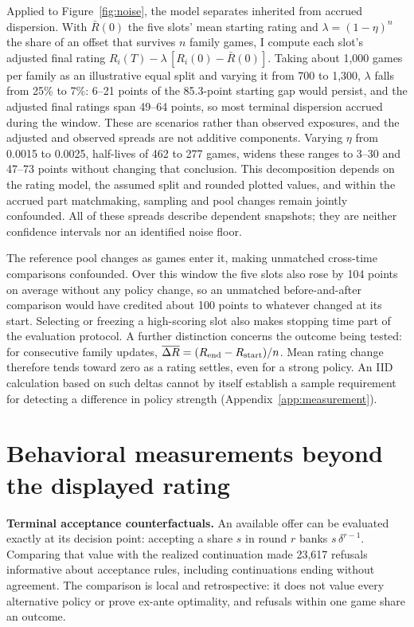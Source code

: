 \documentclass{article}
\begin{document}
Applied to Figure~\ref{fig:noise}, the model separates inherited from accrued
dispersion. With $\bar R(0)$ the five slots' mean starting rating and
$\lambda=(1-\eta)^n$ the share of an offset that survives $n$ family games, I
compute each slot's adjusted final rating $R_i(T)-\lambda\,[R_i(0)-\bar R(0)]$.
Taking about 1,000 games per family as an illustrative equal split and varying it
from 700 to 1,300, $\lambda$ falls from 25\% to 7\%: 6--21 points of the
85.3-point starting gap would persist, and the adjusted final ratings span
49--64 points, so most terminal dispersion accrued during the window. These are
scenarios rather than observed exposures, and the adjusted and observed spreads
are not additive components.
Varying $\eta$ from 0.0015 to 0.0025, half-lives of 462 to 277 games, widens
these ranges to 3--30 and 47--73 points without changing that conclusion. This
decomposition depends on the rating model, the assumed split and rounded
plotted values, and within the accrued part matchmaking, sampling and pool
changes remain jointly confounded. All of these spreads describe dependent
snapshots; they are neither confidence intervals nor an identified noise floor.

The reference pool changes as games enter it, making unmatched cross-time
comparisons confounded. Over this window the five slots also rose by 104 points
on average without any policy change, so an unmatched before-and-after comparison
would have credited about 100 points to whatever changed at its start. Selecting
or freezing a high-scoring slot also makes stopping time part of the evaluation
protocol. A further distinction concerns
the outcome being tested: for consecutive family updates,
\mbox{$\overline{\Delta R}=(R_{\rm end}-R_{\rm start})/n$}.
Mean rating change therefore tends toward zero as a rating settles, even for
a strong policy. An IID calculation based on such deltas cannot by itself
establish a sample requirement for detecting a difference in policy strength
(Appendix~\ref{app:measurement}).

\section{Behavioral measurements beyond the displayed rating}
\textbf{Terminal acceptance counterfactuals.} An available offer can be evaluated
exactly at its decision point: accepting a share $s$ in round $r$ banks
$s\,\delta^{r-1}$. Comparing that value with the realized continuation
made 23,617 refusals informative about acceptance rules, including continuations
ending without agreement. The comparison is local and retrospective: it does not
value every alternative policy or prove ex-ante optimality, and refusals within
one game share an outcome.
\end{document}
